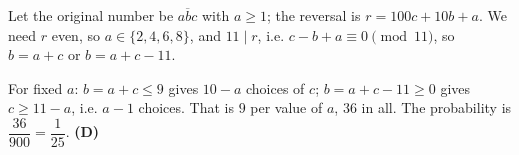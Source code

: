 Let the original number be $\overline{abc}$ with $a\ge1$; the reversal is $r=100c+10b+a$. We need $r$ even, so $a\in\{2,4,6,8\}$, and $11\mid r$, i.e. $c-b+a\equiv0\pmod{11}$, so $b=a+c$ or $b=a+c-11$.

For fixed $a$: $b=a+c\le9$ gives $10-a$ choices of $c$; $b=a+c-11\ge0$ gives $c\ge11-a$, i.e. $a-1$ choices. That is $9$ per value of $a$, $36$ in all. The probability is $\dfrac{36}{900}=\dfrac1{25}$. \textbf{(D)}

